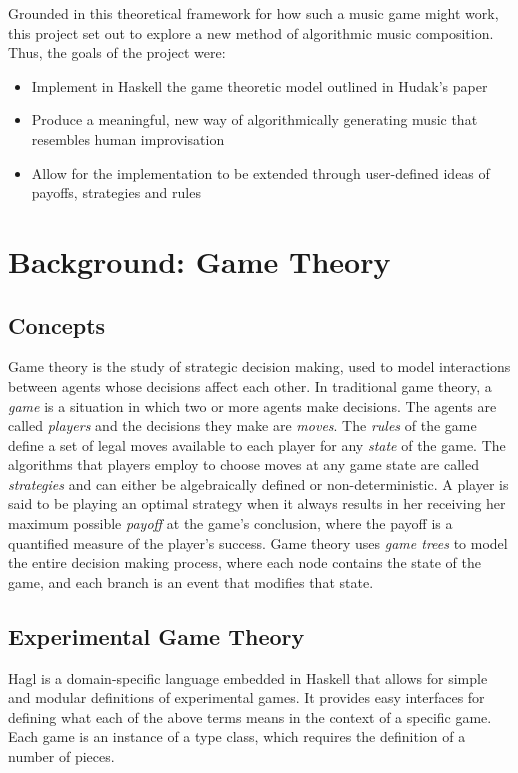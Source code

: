 \documentclass{article}
\begin{document}
Grounded in this theoretical framework for how such a music game might
work, this project set out to explore a new method of algorithmic music
composition. Thus, the goals of the project were:

\begin{itemize}
\itemsep1pt\parskip0pt
\item
  Implement in Haskell the game theoretic model outlined in Hudak's
  paper
\item
  Produce a meaningful, new way of algorithmically generating music that
  resembles human improvisation
\item
  Allow for the implementation to be extended through user-defined ideas
  of payoffs, strategies and rules
\end{itemize}

\section{Background: Game Theory}

\subsection{Concepts}
Game theory is the study of strategic decision making, used to model
interactions between agents whose decisions affect each other. In
traditional game theory, a \emph{game} is a situation in which two or
more agents make decisions. The agents are called \emph{players} and the
decisions they make are \emph{moves}. The \emph{rules} of the game
define a set of legal moves available to each player for any
\emph{state} of the game. The algorithms that players employ to choose
moves at any game state are called \emph{strategies} and can either be
algebraically defined or non-deterministic. A player is said to be
playing an optimal strategy when it always results in her receiving her
maximum possible \emph{payoff} at the game's conclusion, where the
payoff is a quantified measure of the player's success. Game theory uses
\emph{game trees} to model the entire decision making process, where
each node contains the state of the game, and each branch is an event
that modifies that state.

\subsection{Experimental Game Theory}
Hagl is a domain-specific language embedded in Haskell that allows for
simple and modular definitions of experimental games. It provides easy interfaces for
defining what each of the above terms means in the context of a specific
game. Each game is an instance of a type class, which requires the
definition of a number of pieces.
\end{document}
